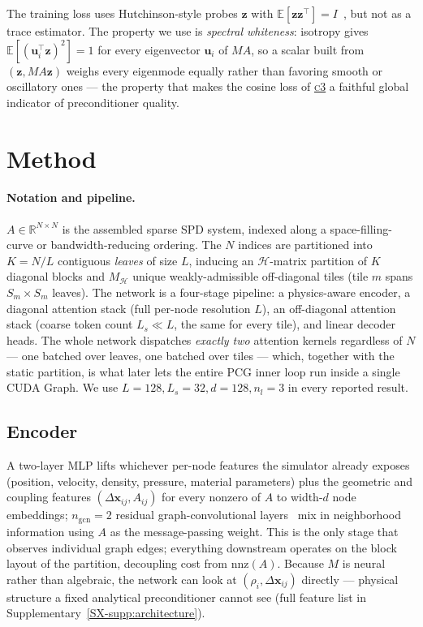 \documentclass[acmtog]{acmart}
\theoremstyle{plain}
\begin{document}
The training loss uses Hutchinson-style probes $\mathbf{z}$ with
$\mathbb{E}[\mathbf{z}\mathbf{z}^\top]\!=\!I$~\cite{hutchinson1989stochastic}, but not as a
trace estimator. The property we use is \emph{spectral whiteness}: isotropy gives
$\mathbb{E}[(\mathbf{u}_i^\top\mathbf{z})^2]\!=\!1$ for every eigenvector $\mathbf{u}_i$ of
$MA$, so a scalar built from $(\mathbf{z},MA\mathbf{z})$ weighs every eigenmode equally
rather than favoring smooth or oscillatory ones --- the property that makes the cosine loss
of \hyperref[intro:loss]{\textsc{c3}} a faithful global indicator of preconditioner quality.

\section{Method}
\label{sec:method}

\paragraph{Notation and pipeline.}
$A\!\in\!\mathbb{R}^{N\times N}$ is the assembled sparse SPD system, indexed along a
space-filling-curve or bandwidth-reducing ordering. The $N$ indices are partitioned into
$K\!=\!N/L$ contiguous \emph{leaves} of size $L$, inducing an $\mathcal{H}$-matrix
partition of $K$ diagonal blocks and $M_{\mathcal{H}}$ unique weakly-admissible
off-diagonal tiles (tile $m$ spans $S_m\!\times\!S_m$ leaves). The network is a four-stage
pipeline: a physics-aware encoder, a diagonal attention stack (full per-node resolution
$L$), an off-diagonal attention stack (coarse token count $L_s\!\ll\!L$, the same for
every tile), and linear decoder heads. The whole network dispatches \emph{exactly two}
attention kernels regardless of $N$ --- one batched over leaves, one batched over tiles
--- which, together with the static partition, is what later lets the entire PCG inner
loop run inside a single CUDA Graph. We use $L\!=\!128, L_s\!=\!32, d\!=\!128, n_l\!=\!3$
in every reported result.

\subsection{Encoder}
\label{sec:method:encoder}
A two-layer MLP lifts whichever per-node features the simulator already exposes
(position, velocity, density, pressure, material parameters) plus the geometric and
coupling features $(\Delta\mathbf{x}_{ij}, A_{ij})$ for every nonzero of $A$ to width-$d$
node embeddings; $n_{\mathrm{gcn}}\!=\!2$ residual graph-convolutional
layers~\cite{kipf2017semi} mix in neighborhood information using $A$ as the
message-passing weight. This is the only stage that observes individual graph edges;
everything downstream operates on the block layout of the partition, decoupling cost
from $\mathrm{nnz}(A)$. Because $M$ is neural rather than algebraic, the network can
look at $(\rho_i, \Delta\mathbf{x}_{ij})$ directly --- physical structure a fixed
analytical preconditioner cannot see (full feature list in
Supplementary~\ref{SX-supp:architecture}).
\end{document}
